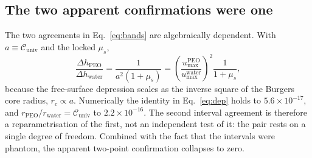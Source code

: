 \documentclass[11pt,a4paper]{article}
\begin{document}
\subsection{The two apparent confirmations were one}
The two agreements in Eq.~\eqref{eq:bands} are algebraically dependent. With
$a \equiv \mathcal{C}_{\mathrm{univ}}$ and the locked $\mu_s$,
\begin{equation}
\label{eq:dep}
\frac{\Delta h_{\mathrm{PEO}}}{\Delta h_{\mathrm{water}}}
= \frac{1}{a^{2}(1+\mu_s)}
= \left(\frac{u_{\max}^{\mathrm{PEO}}}{u_{\max}^{\mathrm{water}}}\right)^{2}
\frac{1}{1+\mu_s},
\end{equation}
because the free-surface depression scales as the inverse square of the
Burgers core radius, $r_c \propto a$. Numerically the identity in
Eq.~\eqref{eq:dep} holds to $5.6\times10^{-17}$, and
$r_{\mathrm{PEO}}/r_{\mathrm{water}} = \mathcal{C}_{\mathrm{univ}}$ to
$2.2\times10^{-16}$. The second interval agreement is therefore a
reparametrisation of the first, not an independent test of it: the pair
rests on a single degree of freedom. Combined with the fact that the
intervals were phantom, the apparent two-point confirmation collapses to
zero.
\end{document}
